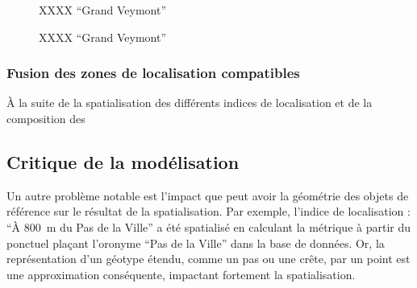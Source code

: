 \begin{figure}
  \centering
  
  \caption{XXXX \enquote{Grand Veymont}}
  \label{fig:fuzzy_veyont_distance}
\end{figure}



\begin{figure}
  \centering
  
  \caption{XXXX \enquote{Grand Veymont}}
  \label{fig:Distance_GrandVeymont}
\end{figure}




\subsubsection{Fusion des zones de localisation compatibles}

À la suite de la spatialisation des différents indices de localisation
et de la composition des 

\subsection{Critique de la modélisation}
\label{subsec:9-2-3}


Un autre problème notable est l'impact que peut avoir la géométrie des
objets de référence sur le résultat de la spatialisation. Par exemple,
l'indice de localisation : \enquote{À \SI{800}{\meter} du Pas de la
  Ville} a été spatialisé en calculant la métrique
 à partir du ponctuel plaçant l'oronyme
\enquote{Pas de la Ville} dans la base de données. Or, la
représentation d'un géotype étendu, comme un pas ou une crête, par un
point est une approximation conséquente, impactant fortement la
spatialisation.


